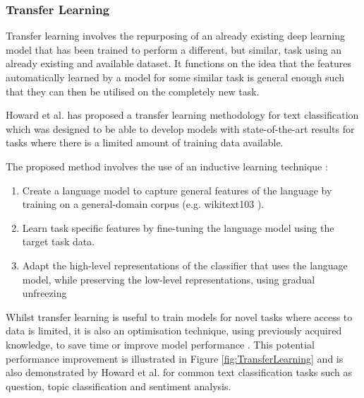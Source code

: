 \documentclass[a4paper,twoside,phd]{BYUPhys}
\begin{document}
\subsubsection{Transfer Learning}
\label{sec:TransferLearningReview}

Transfer learning involves the repurposing of an already existing deep learning model that has been trained to perform a different, but similar, task using an already existing and available dataset. It functions on the idea that the features automatically learned by a model for some similar task is general enough such that they can then be utilised on the completely new task. 

Howard et al. \cite{Howard2018} has proposed a transfer learning methodology for text classification which was designed to be able to develop models with state-of-the-art results for tasks where there is a limited amount of training data available. \newline

The proposed method involves the use of an inductive learning technique \cite{Pan2009}:
\begin{enumerate}
	\item Create a language model to capture general features of the language by training on a general-domain corpus (e.g. wikitext103 \cite{Merity2016}).
	\item Learn task specific features by fine-tuning the language model using the target task data.
	\item Adapt the high-level representations of the classifier that uses the language model, while preserving the low-level representations, using gradual unfreezing \cite{Howard2018}
\end{enumerate}

Whilst transfer learning is useful to train models for novel tasks where access to data is limited, it is also an optimisation technique, using previously acquired knowledge, to save time or improve model performance \cite{Pan2009}. This potential performance improvement is illustrated in Figure \ref{fig:TransferLearning} and is also demonstrated by Howard et al. \cite{Howard2018} for common text classification tasks such as question, topic  classification and sentiment analysis.
\end{document}
